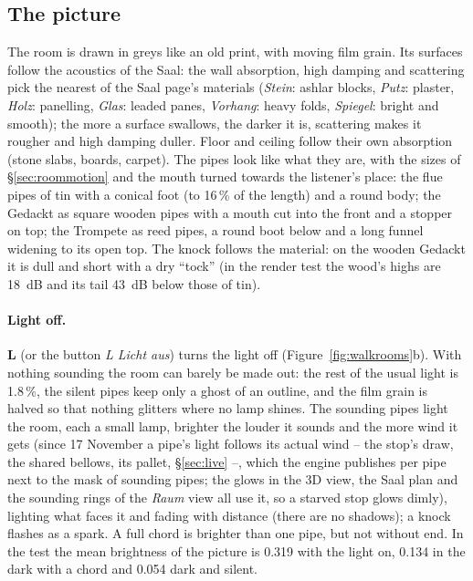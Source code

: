 \documentclass[11pt,a4paper,parskip=half,DIV=11,toc=bibliography]{scrartcl}
\newcommand{\ui}[1]{\emph{#1}}                 %
\begin{document}
\subsection{The picture}
\label{sec:walkgpu}
The room is drawn in greys like an old print, with moving film grain. Its surfaces follow the acoustics of the Saal:
the wall absorption, high damping and scattering pick the nearest of the Saal page's materials (\ui{Stein}: ashlar blocks,
\ui{Putz}: plaster, \ui{Holz}: panelling, \ui{Glas}: leaded panes, \ui{Vorhang}: heavy folds, \ui{Spiegel}: bright and smooth);
the more a surface swallows, the darker it is, scattering makes it rougher and high damping duller. Floor and ceiling follow
their own absorption (stone slabs, boards, carpet). The pipes look like what they are, with the sizes of \S\ref{sec:roommotion} and the
mouth turned towards the listener's place: the flue pipes of tin with a conical foot (to 16\,\% of the length) and a round body; the Gedackt as
square wooden pipes with a mouth cut into the front and a stopper on top; the Trompete as reed pipes, a round boot below and a long funnel
widening to its open top. The knock follows the material: on the wooden Gedackt it is dull and short with a dry \enquote{tock} (in the render
test the wood's highs are \SI{18}{dB} and its tail \SI{43}{dB} below those of tin).

\paragraph{Light off.} \textbf{L} (or the button \ui{L Licht aus}) turns the light off (Figure~\ref{fig:walkrooms}b). With nothing sounding the room can
barely be made out: the rest of the usual light is 1.8\,\%, the silent pipes keep only a ghost of an outline, and the film grain is halved so
that nothing glitters where no lamp shines. The sounding pipes light the room, each a small lamp, brighter the louder it sounds and the more wind it
gets (since 17 November a pipe's light follows its actual wind -- the stop's draw, the shared bellows, its pallet, \S\ref{sec:live} --, which the
engine publishes per pipe next to the mask of sounding pipes; the glows in the 3D view, the Saal plan and the sounding rings of the \ui{Raum} view
all use it, so a starved stop glows dimly), lighting
what faces it and fading with distance (there are no shadows); a knock flashes as a spark. A full chord is brighter than one pipe, but not without end.
In the test the mean brightness of the picture is 0.319 with the light on, 0.134 in the dark with a chord and 0.054 dark and silent.
\end{document}
